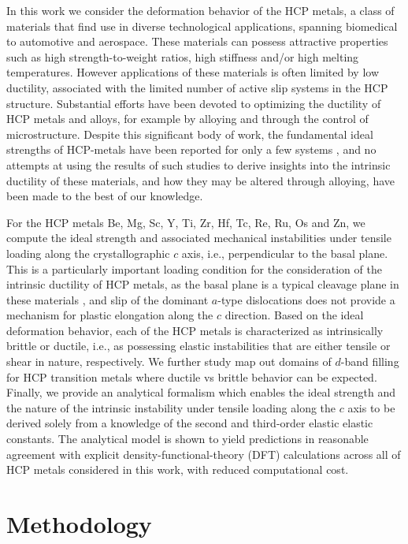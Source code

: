 \documentclass[showpacs,aps,floatfix,prb,reprint,superscriptaddress]{revtex4-1}
\begin{document}
In this work we consider the deformation behavior of the HCP metals, a class of materials that find use in diverse technological applications, spanning biomedical to automotive and aerospace. These materials can possess attractive properties such as high strength-to-weight ratios, high stiffness and/or high melting temperatures. However applications of these materials is often limited by low ductility, associated with the limited number of active slip systems in the HCP structure. Substantial efforts have been devoted to optimizing the ductility of HCP metals and alloys, for example by alloying and through the control of microstructure. Despite this significant body of work, the fundamental ideal strengths of HCP-metals have been reported for only a few systems \cite{fu2012first}, and no attempts at using the results of such studies to derive insights into the intrinsic ductility of these materials, and how they may be altered through alloying, have been made to the best of our knowledge.

For the HCP metals Be, Mg, Sc, Y, Ti, Zr, Hf, Tc, Re, Ru, Os and Zn, we compute the ideal strength and associated mechanical instabilities under tensile loading along the crystallographic $c$ axis, i.e., perpendicular to the basal plane.  This is a particularly important loading condition for the consideration of the intrinsic ductility of HCP metals, as the basal plane is a typical cleavage plane in these materials \cite{yoo1981slip}, and slip of the dominant $a$-type dislocations does not provide a mechanism for plastic elongation along the $c$ direction. Based on the ideal deformation behavior, each of the HCP metals is characterized as intrinsically brittle or ductile, i.e., as  possessing elastic instabilities that are either tensile or shear in nature, respectively. We further study map out domains of $d$-band filling for HCP transition metals where ductile vs brittle behavior can be expected.  Finally, we provide an analytical formalism which enables the ideal strength and the nature of the intrinsic instability under tensile loading along the $c$ axis to be derived solely from a knowledge of the second and third-order elastic elastic constants.  The analytical model is shown to yield predictions in reasonable agreement with explicit density-functional-theory (DFT) calculations across all of HCP metals considered in this work, with reduced computational cost.

\section{Methodology}
\end{document}
